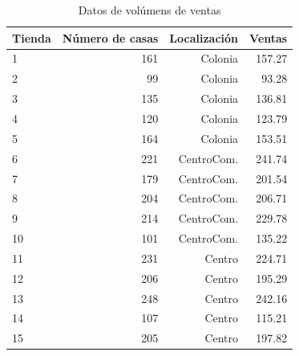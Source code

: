 \documentclass[10.5pt,notitlepage]{article}
\theoremstyle{plain}
\begin{document}
  \begin{table}[htbp]
        \caption{Datos de volúmens de ventas}
        \centering\begin{tabular}{@{}lrrr@{}}
            \toprule
            Tienda & Número de casas & Localización & Ventas \\
            \midrule
            1 & 161 & Colonia & 157.27 \\
            2 & 99 & Colonia & 93.28 \\
            3 & 135 & Colonia & 136.81 \\
            4 & 120 & Colonia & 123.79 \\
            5 & 164 & Colonia & 153.51 \\
            6 & 221 & CentroCom. & 241.74 \\
            7 & 179 & CentroCom. & 201.54 \\
            8 & 204 & CentroCom. & 206.71 \\
            9 & 214 & CentroCom. & 229.78 \\
            10 & 101 & CentroCom. & 135.22 \\
            11 & 231 & Centro & 224.71 \\
            12 & 206 & Centro & 195.29 \\
            13 & 248 & Centro & 242.16 \\
            14 & 107 & Centro & 115.21 \\
            15 & 205 & Centro & 197.82 \\
            \bottomrule
        \end{tabular}
        \label{tab 3}
    \end{table}
\end{document}
